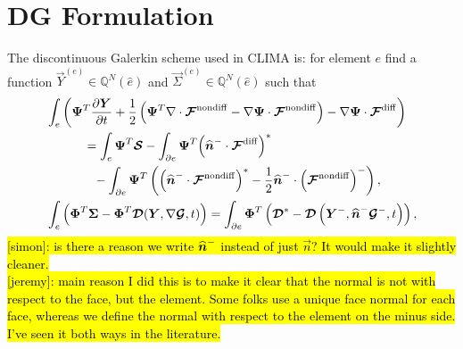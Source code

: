 \documentclass{report}
\begin{document}
\section{DG Formulation}
The discontinuous Galerkin scheme used in CLIMA is: for element $e$ find a
function $\vec{Y}^{(e)} \in \mathbb{Q}^{N}(\hat{e})$
and $\vec{\Sigma}^{(e)} \in \mathbb{Q}^{N}(\hat{e})$
such that
\begin{align}
  &\int_{e}
  \left(
  \boldsymbol{{\Psi}}^T \frac{\partial \boldsymbol{{Y}}}{\partial t}
  + \frac{1}{2}
  \left(
  \boldsymbol{{\Psi}}^{T} \nabla \cdot \boldsymbol{{\mathcal{F}}}^{\mathrm{nondiff}}
  -
  \nabla\boldsymbol{{\Psi}} \cdot
  \boldsymbol{{\mathcal{F}}}^{\mathrm{nondiff}}
  \right)
  -
  \nabla\boldsymbol{{\Psi}} \cdot
  \boldsymbol{{\mathcal{F}}}^{\mathrm{diff}}
  \right)
  \label{eq:dg_formulation/governing_equations} \\\notag
  &\quad\quad\quad =
  \int_{e} \boldsymbol{{\Psi}}^T \boldsymbol{{\mathcal{S}}}
  -
  \int_{\partial e}
  \boldsymbol{{\Psi}}^{T}
  {\left(\widehat{\boldsymbol{{n}}}^{-} \cdot \boldsymbol{{\mathcal{F}}}^{\mathrm{diff}}\right)}^{*}
  \\\notag
  &\quad\quad\quad\phantom{=}-
  \int_{\partial e}
  \boldsymbol{{\Psi}}^{T} \left(
  {\left(\widehat{\boldsymbol{{n}}}^{-} \cdot \boldsymbol{{\mathcal{F}}}^{\mathrm{nondiff}}\right)}^{*}
  - \frac{1}{2} \widehat{\boldsymbol{{n}}}^{-} \cdot {\left(\boldsymbol{{\mathcal{F}}}^{\mathrm{nondiff}}\right)}^{-}
  \right)
  ,\\
  &\int_{e}
  \left(
  \boldsymbol{{\Phi}}^T \boldsymbol{{\Sigma}}
  -
  \boldsymbol{{\Phi}}^T \boldsymbol{{\mathcal{D}}}(\boldsymbol{{Y}}, \nabla \boldsymbol{{\mathcal{G}}}, t)
  \right)
  =
  \int_{\partial e} \boldsymbol{{\Phi}}^{T} \left(
  \boldsymbol{{\mathcal{D}}}^{*} - \boldsymbol{{\mathcal{D}}}\left(\boldsymbol{{Y}}^{-},
  \widehat{\boldsymbol{{n}}}^{-}\boldsymbol{{\mathcal{G}}}^{-}, t\right)
  \right),
  \label{eq:dg_formulation/auxiliary_equations}
\end{align}
\hl{[simon]: is there a reason we write $\widehat{\boldsymbol{{n}}}^{-}$ instead of just $\vec{n}$? It would make it slightly cleaner.}\\
\hl{[jeremy]: main reason I did this is to make it clear that the normal is not with respect to the face, but the element. Some folks use a unique face normal for each face, whereas we define the normal with respect to the element on the minus side. I've seen it both ways in the literature.}
\end{document}
